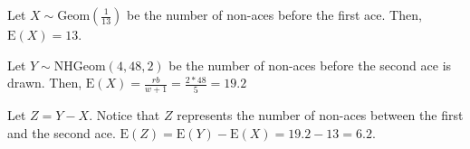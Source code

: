 Let $X \sim \text{Geom}(\frac{1}{13})$ be the number of non-aces before the
first
ace. Then, $\text{E}(X) = 13$.

Let $Y \sim \text{NHGeom}(4, 48, 2)$ be the number of non-aces before the second
ace is drawn. Then, $\text{E}(X) = \frac{rb}{w+1} = \frac{2*48}{5} = 19.2$

Let $Z = Y - X$. Notice that $Z$ represents the number of non-aces between the
first and the second ace. $\text{E}(Z) = \text{E}(Y) - \text{E}(X) = 19.2 - 13 =
6.2$.